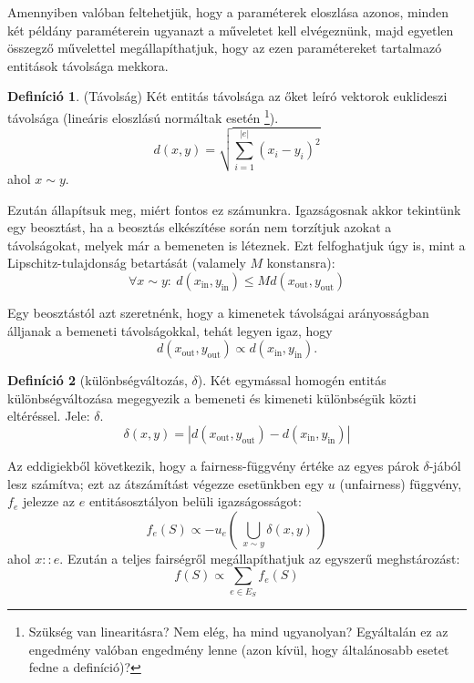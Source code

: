 \documentclass[twocolumn]{article}
\theoremstyle{definition}
\newtheorem{definition}{Definíció}[section]
\newcommand{\subin}[1]{ {#1}_{\text{in}} }
\newcommand{\subout}[1]{ {#1}_{\text{out}} }
\begin{document}
    Amennyiben valóban feltehetjük, hogy a paraméterek eloszlása azonos, minden két példány paraméterein ugyanazt a műveletet kell elvégeznünk, majd egyetlen összegző művelettel megállapíthatjuk, hogy az ezen paramétereket tartalmazó entitások távolsága mekkora. 
    
    \begin{definition} (Távolság) \label{def:tavolsag}
        Két entitás távolsága az őket leíró vektorok euklideszi távolsága (lineáris eloszlású normáltak esetén \footnote{Szükség van linearitásra? Nem elég, ha mind ugyanolyan? Egyáltalán ez az engedmény valóban engedmény lenne (azon kívül, hogy általánosabb esetet fedne a definíció)?}).
        \begin{equation}
            d(x, y) = \sqrt{\sum_{i=1}^{|e|} (x_i - y_i)^2 } 
        \end{equation}
        ahol $x \sim y$.
    \end{definition}
    
    Ezután állapítsuk meg, miért fontos ez számunkra. Igazságosnak akkor tekintünk egy beosztást, ha a beosztás elkészítése során nem torzítjuk azokat a távolságokat, melyek már a bemeneten is léteznek. Ezt felfoghatjuk úgy is, mint a Lipschitz-tulajdonság betartását (valamely $M$ konstansra):
    \begin{equation}
        \forall x \sim y : \ d(\subin{x}, \subin{y}) \leq Md(\subout{x}, \subout{y})
    \end{equation}
    
    Egy beosztástól azt szeretnénk, hogy a kimenetek távolságai arányosságban álljanak a bemeneti távolságokkal, tehát legyen igaz, hogy
    \begin{equation}
        d(\subout x, \subout y) \propto d(\subin x, \subin y).
    \end{equation}
    
    \begin{definition}[különbségváltozás, $\delta$]
        Két egymással homogén entitás különbségváltozása megegyezik a bemeneti és kimeneti különbségük közti eltéréssel. Jele: $\delta$.
        \begin{equation}
            \delta(x, y) = |d(\subout x, \subout y) - d(\subin x, \subin y)|
        \end{equation}
    \end{definition}

    Az eddigiekből következik, hogy a fairness-függvény értéke az egyes párok $\delta$-jából lesz számítva; ezt az átszámítást végezze esetünkben egy $u$ (unfairness) függvény, $f_e$ jelezze az $e$ entitásosztályon belüli igazságosságot:
    \begin{equation}
        f_e(S) \propto -u_e\left(\ \bigcup_{x \sim y} \delta(x, y)\ \right)
    \end{equation}
    ahol $x::e$. Ezután a teljes fairségről megállapíthatjuk az egyszerű meghstározást:
    \begin{equation}
        f(S) \propto \sum_{e \in E_S} f_e(S)
    \end{equation}
    
\end{document}
